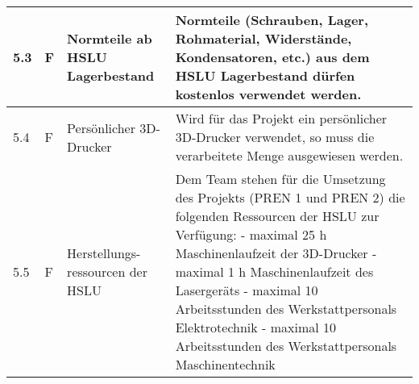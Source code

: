 \documentclass[main.tex]{subfiles} %
\begin{document}
\begin{tabular}{|l|p{0.5cm}|p{4cm}|p{10cm}|}
  \hline
  5.3          & F          & Normteile ab HSLU Lagerbestand   & Normteile (Schrauben, Lager, Rohmaterial, Widerstände, Kondensatoren, etc.) aus dem HSLU Lagerbestand dürfen kostenlos verwendet werden.                                                                                                                                                                                                                                                      \\
  \hline
  5.4          & F          & Persönlicher 3D-Drucker          & Wird für das Projekt ein persönlicher 3D-Drucker verwendet, so muss die verarbeitete Menge ausgewiesen werden.                                                                                                                                                                                                                                                                                \\
  \hline
  5.5          & F          & Herstellungs-ressourcen der HSLU & Dem Team stehen für die Umsetzung des Projekts (PREN 1 und PREN 2) die folgenden Ressourcen der HSLU zur Verfügung: \newline - maximal 25 h Maschinenlaufzeit der 3D-Drucker \newline - maximal 1 h Maschinenlaufzeit des Lasergeräts \newline - maximal 10 Arbeitsstunden des Werkstattpersonals Elektrotechnik \newline - maximal 10 Arbeitsstunden des Werkstattpersonals Maschinentechnik \\
  \hline
\end{tabular}

\newpage
\end{document}
